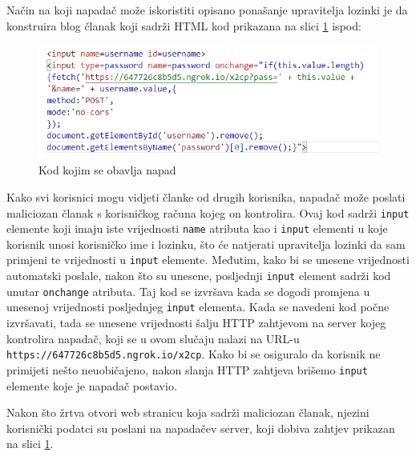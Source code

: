 \documentclass[12pt, oneside, onecolumn]{book}
\begin{document}
{Način na koji napadač može iskoristiti opisano ponašanje upravitelja lozinki je da konstruira blog članak koji sadrži HTML kod prikazana na slici \ref{fig:xss2cp_pay} ispod:

\begin{figure}[H]
	\begin{center}
		\includegraphics[width=\textwidth]{xss2cp_pay.jpg}
		\caption{Kod kojim se obavlja napad} \label{fig:xss2cp_pay}
	\end{center}
\end{figure}

Kako svi korisnici mogu vidjeti članke od drugih korisnika, napadač može poslati maliciozan članak s korisničkog računa kojeg on kontrolira. Ovaj kod sadrži \texttt{input} elemente koji imaju iste vrijednosti \texttt{name} atributa kao i \texttt{input} elementi u koje korisnik unosi korisničko ime i lozinku, što će natjerati upravitelja lozinki da sam primjeni te vrijednosti u \texttt{input} elemente. Međutim, kako bi se unesene vrijednosti automatski poslale, nakon što su unesene, posljednji \texttt{input} element sadrži kod unutar \texttt{onchange} atributa. Taj kod se izvršava kada se dogodi promjena u unesenoj vrijednosti posljednjeg \texttt{input} elementa. Kada se navedeni kod počne izvršavati, tada se unesene vrijednosti šalju HTTP zahtjevom na server kojeg kontrolira napadač, koji se u ovom slučaju nalazi na URL-u \texttt{https://647726c8b5d5.ngrok.io/x2cp}. Kako bi se osiguralo da korisnik ne primijeti nešto neuobičajeno, nakon slanja HTTP zahtjeva brišemo \texttt{input} elemente koje je napadač postavio.

Nakon što žrtva otvori web stranicu koja sadrži maliciozan članak, njezini korisnički podatci su poslani na napadačev server, koji dobiva zahtjev prikazan na slici \ref{fig:xss2cp_pay}.

}
\end{document}
